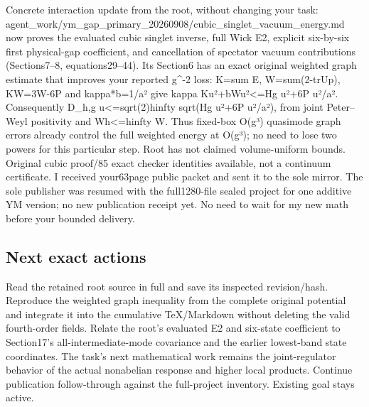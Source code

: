 Concrete interaction update from the root, without changing your task:
agent\_work/ym\_gap\_primary\_20260908/cubic\_singlet\_vacuum\_energy.md
now proves the evaluated cubic singlet inverse, full Wick E2, explicit
six-by-six first physical-gap coefficient, and cancellation of spectator
vacuum contributions (Sections7--8, equations29--44). Its Section6 has
an exact original weighted graph estimate that improves your reported
g\^{}-2 loss: K=sum E, W=sum(2-trUp), KW=3W-6\textbar P\textbar{} and
kappa*b=1/a² give \textbar\textbar kappa
Ku\textbar\textbar²+\textbar\textbar bWu\textbar\textbar²\textless=\textbar\textbar Hg
u\textbar\textbar²+6\textbar P\textbar{}
\textbar\textbar u\textbar\textbar²/a². Consequently
\textbar\textbar D\_h,g
u\textbar\textbar\textless=sqrt(2)\textbar\textbar h\textbar\textbar infty
sqrt(\textbar\textbar Hg u\textbar\textbar²+6\textbar P\textbar{}
\textbar\textbar u\textbar\textbar²/a²), from joint Peter--Weyl
positivity and
\textbar Wh\textbar\textless=\textbar\textbar h\textbar\textbar infty W.
Thus fixed-box O(g³) quasimode graph errors already control the full
weighted energy at O(g³); no need to lose two powers for this particular
step. Root has not claimed volume-uniform bounds. Original cubic
proof/85 exact checker identities available, not a continuum
certificate. I received your63page public packet and sent it to the sole
mirror. The sole publisher was resumed with the full1280-file sealed
project for one additive YM version; no new publication receipt yet. No
need to wait for my new math before your bounded delivery.

\subsection{Next exact actions}\label{root-publication-and-graph-intake-20260909-md-next-exact-actions}

Read the retained root source in full and save its inspected
revision/hash. Reproduce the weighted graph inequality from the complete
original potential and integrate it into the cumulative TeX/Markdown
without deleting the valid fourth-order fields. Relate the root's
evaluated E2 and six-state coefficient to Section17's
all-intermediate-mode covariance and the earlier lowest-band state
coordinates. The task's next mathematical work remains the
joint-regulator behavior of the actual nonabelian response and higher
local products. Continue publication follow-through against the
full-project inventory. Existing goal stays active.
